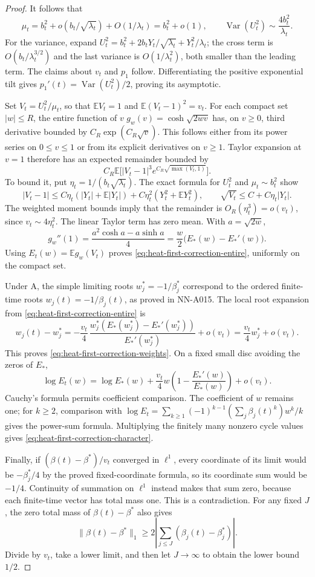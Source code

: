 \begin{proof}
It follows that
\[
 \mu_t=b_t^2+o(b_t/\sqrt{\lambda_t})+O(1/\lambda_t)
          =b_t^2+o(1),
 \qquad
 \operatorname{Var}(U_t^2)\sim\frac{4b_t^2}{\lambda_t}.
\]
For the variance, expand
$U_t^2=b_t^2+2b_tY_t/\sqrt{\lambda_t}+Y_t^2/\lambda_t$;
the cross term is $O(b_t/\lambda_t^{3/2})$ and the last variance
is $O(1/\lambda_t^2)$, both smaller than the leading term.
The claims about $v_t$ and $p_1$ follow. Differentiating the
positive exponential tilt gives
$p_1'(t)=\operatorname{Var}(U_t^2)/2$, proving its asymptotic.

Set $V_t=U_t^2/\mu_t$, so that $\mathbb E V_t=1$ and
$\mathbb E(V_t-1)^2=v_t$. For each compact set $|w|\le R$,
the entire function of $v$
$g_w(v)=\cosh\sqrt{2wv}$ has, on $v\ge0$, third derivative bounded
by $C_R\exp(C_R\sqrt v)$. This follows either from its power
series on $0\le v\le1$ or from its explicit derivatives on
$v\ge1$. Taylor expansion at $v=1$ therefore has an expected
remainder bounded by
\[
 C_R\mathbb E\bigl[|V_t-1|^3
                         e^{C_R\sqrt{\max(V_t,1)}}\bigr].
\]
To bound it, put $\eta_t=1/(b_t\sqrt{\lambda_t})$. The exact
formula for $U_t^2$ and $\mu_t\sim b_t^2$ show
\[
 |V_t-1|\le C\eta_t(|Y_t|+\mathbb E|Y_t|)
       +C\eta_t^2(Y_t^2+\mathbb E Y_t^2),
 \qquad
 \sqrt{V_t}\le C+C\eta_t|Y_t|.
\]
The weighted moment bounds imply that the remainder is
$O_R(\eta_t^3)=o(v_t)$, since $v_t\sim4\eta_t^2$.
The linear Taylor term has zero mean. With $a=\sqrt{2w}$,
\[
 g_w''(1)=\frac{a^2\cosh a-a\sinh a}{4}
          =\frac w2\bigl(E_*(w)-E_*'(w)\bigr).
\]
Using $E_t(w)=\mathbb E g_w(V_t)$ proves
\eqref{eq:heat-first-correction-entire}, uniformly on the compact set.

Under A, the simple limiting roots
$w_j^*=-1/\beta_j^*$ correspond to the ordered finite-time roots
$w_j(t)=-1/\beta_j(t)$, as proved in NN-A015. The local root
expansion from \eqref{eq:heat-first-correction-entire} is
\[
 w_j(t)-w_j^*
 =-\frac{v_t}{4}\,
       \frac{w_j^*(E_*(w_j^*)-E_*'(w_j^*))}{E_*'(w_j^*)}
       +o(v_t)
 =\frac{v_t}{4}w_j^*+o(v_t).
\]
This proves \eqref{eq:heat-first-correction-weights}. On a fixed
small disc avoiding the zeros of $E_*$,
\[
 \log E_t(w)=\log E_*(w)+\frac{v_t}{4}
                w\left(1-\frac{E_*'(w)}{E_*(w)}\right)+o(v_t).
\]
Cauchy's formula permits coefficient comparison. The coefficient
of $w$ remains one; for $k\ge2$, comparison with
$\log E_t=\sum_{k\ge1}(-1)^{k-1}(\sum_j\beta_j(t)^k)w^k/k$
gives the power-sum formula. Multiplying the finitely many nonzero
cycle values gives \eqref{eq:heat-first-correction-character}.

Finally, if $(\beta(t)-\beta^*)/v_t$ converged in $\ell^1$, every
coordinate of its limit would be $-\beta_j^*/4$ by the proved
fixed-coordinate formula, so its coordinate sum would be $-1/4$.
Continuity of summation on $\ell^1$ instead makes that sum zero,
because each finite-time vector has total mass one. This is a
contradiction. For any fixed $J$, the zero total mass of
$\beta(t)-\beta^*$ also gives
\[
 \|\beta(t)-\beta^*\|_1
 \ge2\left|\sum_{j\le J}(\beta_j(t)-\beta_j^*)\right|.
\]
Divide by $v_t$, take a lower limit, and then let $J\to\infty$ to
obtain the lower bound $1/2$.
\end{proof}

